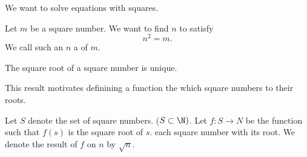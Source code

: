
\sbasic

















\sstart
{}


We want to solve equations
with squares.


Let $m$ be a square number.
We want to find $n$ to satisfy
\[
  n^2 = m.
\]
We call such an $n$ a
of $m$.

\begin{prop}
The square root of a square
number is unique.
\end{prop}

This result motivates
definining a function
the
which square numbers
to their roots.


Let $S$ denote the set
of square numbers.
($S \subset \N)$.
Let $f: S \to N$ be
the function such that
$f(s)$ is the square root
of $s$.
each square number
with its root.
We denote
the result of $f$ on $n$
by $\sqrt{n}$.
\strats
